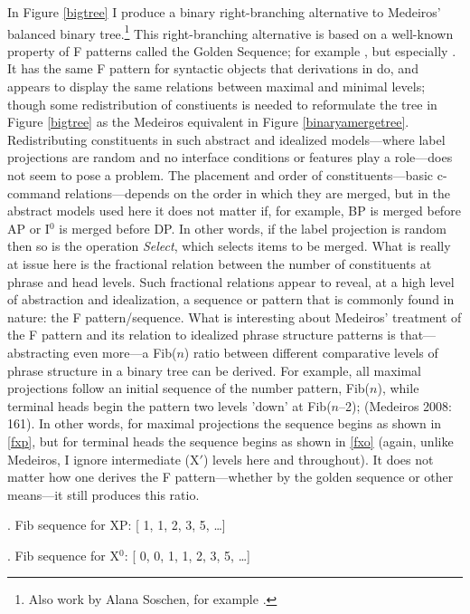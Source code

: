 \documentclass[11pt,twoside]{article}
\begin{document}
In Figure \ref{bigtree} I produce a binary right-branching alternative to Medeiros' balanced binary tree.\footnote{Also work by Alana Soschen, for example \cite{soschen:2008}.} This right-branching alternative is based on a well-known property of F patterns called the Golden Sequence; for example \cite{livio:2002}, but especially \cite{uriagereka:1998}. It has the same F pattern for syntactic objects that derivations in \cite{medeiros:2008} do, and appears to display the same relations between maximal and minimal levels; though some redistribution of constiuents is needed to reformulate the tree in Figure \ref{bigtree} as the Medeiros equivalent in Figure \ref{binaryamergetree}. Redistributing constituents in such abstract and idealized models---where label projections are random and no interface conditions or features play a role---does not seem to pose a problem. The placement and order of constituents---basic c-command relations---depends on the order in which they are merged, but in the abstract models used here it does not matter if, for example, BP is merged before AP or I$^{0}$ is merged before DP. In other words, if the label projection is random then so is the operation \textsl{Select}, which selects items to be merged. What is really at issue here is the fractional relation between the number of constituents at phrase and head levels. Such fractional relations appear to reveal, at a high level of abstraction and idealization, a sequence or pattern that is commonly found in nature: the F pattern/sequence. 
What is interesting about Medeiros' treatment of the F pattern and its relation to idealized phrase structure patterns is that---abstracting even more---a Fib($n$) ratio between different comparative levels of phrase structure in a binary tree can be derived. For example, all maximal projections follow an initial sequence of the number pattern, Fib($n$), while terminal heads begin the pattern two levels 'down' at Fib($n$--2); (Medeiros 2008: 161). In other words, for maximal projections the sequence begins as shown in \ref{fxp}, but for terminal heads the sequence begins as shown in \ref{fxo} (again, unlike Medeiros, I ignore intermediate (X$'$) levels here and throughout). It does not matter how one derives the F pattern---whether by the golden sequence or other means---it still produces this ratio.  

\ex. Fib sequence for XP: [ 1, 1, 2, 3, 5, \ldots ]\label{fxp}

\ex. Fib sequence for X$^{0}$: [ 0, 0, 1, 1, 2, 3, 5, \ldots ]\label{fxo}	
\end{document}
